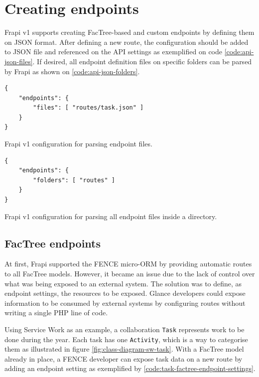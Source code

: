 \section{Creating endpoints}\label{sec:creating-endpoints}

Frapi v1 supports creating FacTree-based and custom endpoints by defining them on JSON format. After defining a new route, the configuration should be added to JSON file and referenced on the API settings as exemplified on code \autoref{code:api-json-files}. If desired, all endpoint definition files on specific folders can be parsed by Frapi as shown on \autoref{code:api-json-folders}.

\begin{listing}[htbp]
\begin{verbatim}
{
	"endpoints": {
	    "files": [ "routes/task.json" ]
	}
}
\end{verbatim}
\caption{Frapi v1 configuration for parsing endpoint files.}
\label{code:api-json-files}
\end{listing}

\begin{listing}[htbp]
\begin{verbatim}
{
	"endpoints": {
		"folders": [ "routes" ]
	}
}
\end{verbatim}
\caption{Frapi v1 configuration for parsing all endpoint files inside a directory.}
\label{code:api-json-folders}
\end{listing}

\subsection{FacTree endpoints}

At first, Frapi supported the FENCE micro-ORM by providing automatic routes to all FacTree models. However, it became an issue due to the lack of control over what was being exposed to an external system. The solution was to define, as endpoint settings, the resources to be exposed. Glance developers could expose information to be consumed by external systems by configuring routes without writing a single PHP line of code.

Using Service Work as an example, a collaboration \texttt{Task} represents work to be done during the year. Each task has one \texttt{Activity}, which is a way to categorise them as illustrated in figure \autoref{fig:class-diagram-sw-task}. With a FacTree model already in place, a FENCE developer can expose task data on a new route by adding an endpoint setting as exemplified by \autoref{code:task-factree-endpoint-settings}.


